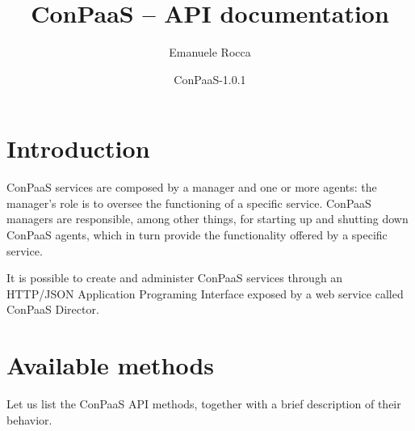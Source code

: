 \documentclass[10pt]{article}
\title{ConPaaS -- API documentation\htmlonly{ [\xml{a href="api.pdf"}pdf\xml{/a}]}}
\author{Emanuele Rocca}
\date{ConPaaS-1.0.1}
\begin{document}
\maketitle


\section{Introduction}
\label{intro}
ConPaaS services are composed by a manager and one or more agents: the
manager's role is to oversee the functioning of a specific service. ConPaaS
managers are responsible, among other things, for starting up and shutting down
ConPaaS agents, which in turn provide the functionality offered by a specific
service.

It is possible to create and administer ConPaaS services through an HTTP/JSON
Application Programing Interface exposed by a web service called ConPaaS
Director. 

\pagebreak 

\section{Available methods}
Let us list the ConPaaS API methods, together with a brief description of their
behavior.
\end{document}
